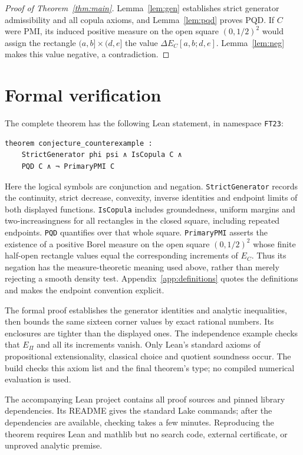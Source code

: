 \documentclass[11pt]{article}
\begin{document}
\begin{proof}[Proof of Theorem~\ref{thm:main}]
Lemma~\ref{lem:gen} establishes strict generator admissibility and all
copula axioms, and Lemma~\ref{lem:pqd} proves PQD. If $C$ were PMI, its
induced positive measure on the open square $(0,1/2)^2$ would assign the
rectangle $(a,b]\times(d,e]$ the value $\Delta E_C[a,b;d,e]$.
Lemma~\ref{lem:neg} makes this value negative, a contradiction.
\end{proof}

\section{Formal verification}\label{sec:formal}
The complete theorem has the following Lean statement, in namespace
\texttt{FT23}:
\begin{verbatim}
theorem conjecture_counterexample :
    StrictGenerator phi psi ∧ IsCopula C ∧
    PQD C ∧ ¬ PrimaryPMI C
\end{verbatim}
Here the logical symbols are conjunction and negation.
\texttt{StrictGenerator} records the continuity, strict decrease,
convexity, inverse identities and endpoint limits of both displayed
functions. \texttt{IsCopula} includes groundedness, uniform margins and
two-increasingness for all rectangles in the closed square, including
repeated endpoints. \texttt{PQD} quantifies over that whole square.
\texttt{PrimaryPMI} asserts the existence of a positive Borel measure on
the open square $(0,1/2)^2$ whose finite half-open rectangle values equal
the corresponding increments of $E_C$. Thus its negation has the
measure-theoretic meaning used above, rather than merely rejecting a
smooth density test. Appendix~\ref{app:definitions} quotes the definitions
and makes the endpoint convention explicit.

The formal proof establishes the generator identities and analytic
inequalities, then bounds the same sixteen corner values by exact
rational numbers. Its enclosures are tighter than the displayed ones.
The independence example checks that $E_\Pi$ and all its increments
vanish.
Only Lean's standard axioms of propositional extensionality, classical
choice and quotient soundness occur. The build checks this axiom list
and the final theorem's type; no compiled numerical evaluation is used.

The accompanying Lean project contains all proof sources and pinned
library dependencies. Its README gives the standard Lake commands;
after the dependencies are available, checking takes a few minutes.
Reproducing the theorem requires Lean and mathlib but no search code,
external certificate, or unproved analytic premise.
\end{document}
